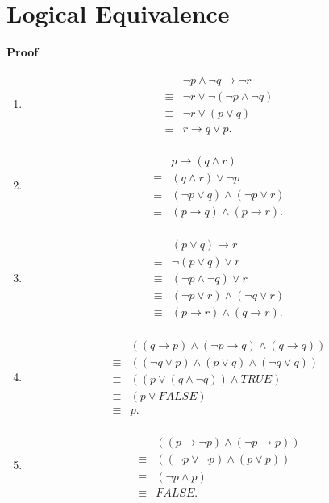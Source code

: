 \documentclass{../../cls/sig-alternate-05-2015}
\begin{document}
\section{Logical Equivalence}
\textbf{Proof}\begin{enumerate}[label=(\alph*)]
	\item \begin{align}
	\begin{aligned}
	& \lnot p \land \lnot q \rightarrow \lnot r\\
	\equiv & \lnot r \lor \lnot (\lnot p \land \lnot q)\\
	\equiv & \lnot r \lor (p \lor q)\\
	\equiv & r \rightarrow q \lor p.
	\end{aligned}
	\end{align}
	\item \begin{align}
		\begin{aligned}
		& p \rightarrow (q \land r)\\
		\equiv & (q \land r) \lor \lnot p\\
		\equiv & (\lnot p \lor q) \land (\lnot p \lor r)\\
		\equiv & (p \rightarrow q) \land (p \rightarrow r).
		\end{aligned}
	\end{align}
	\item \begin{align}
		\begin{aligned}
		& (p \lor q) \rightarrow r\\
		\equiv & \lnot (p \lor q) \lor r\\
		\equiv & (\lnot p \land \lnot q) \lor r\\
		\equiv & (\lnot p \lor r) \land (\lnot q \lor r)\\
		\equiv & (p \rightarrow r) \land (q \rightarrow r).
		\end{aligned}
	\end{align}
	\item \begin{align}
		\begin{aligned}
		& ((q \rightarrow p) \land (\lnot p \rightarrow q) \land (q \rightarrow q))\\
		\equiv & ((\lnot q \lor p) \land (p \lor q) \land (\lnot q \lor q))\\
		\equiv & ((p \lor (q \land \lnot q)) \land TRUE)\\
		\equiv & (p \lor FALSE)\\
		\equiv & p.
		\end{aligned}
	\end{align}
	\item \begin{align}
		\begin{aligned}
		& ((p \rightarrow \lnot p) \land (\lnot p \rightarrow p))\\
		\equiv & ((\lnot p \lor \lnot p) \land (p \lor p))\\ \equiv & (\lnot p \land p)\\
		\equiv & FALSE.
		\end{aligned}
	\end{align}
\end{enumerate}
\end{document}
